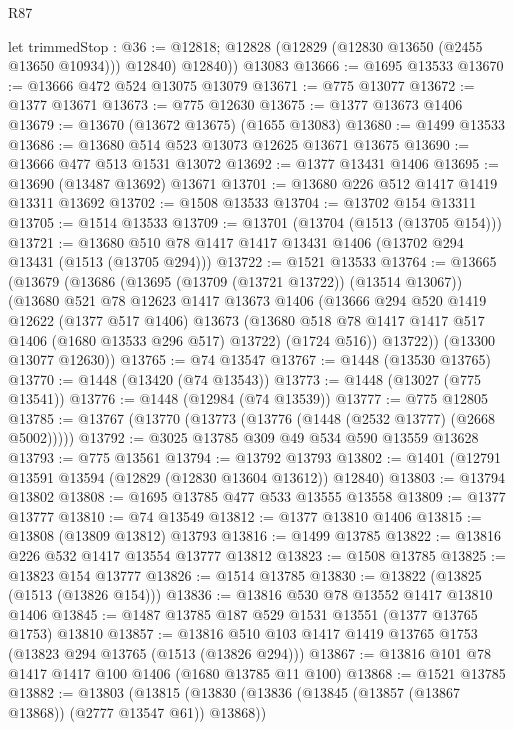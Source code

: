 \begin{lexlean}{R87}
\begin{coremodule}
{{        let trimmedStop : @36 := @12818;
        @12828 (@12829 (@12830 @13650 (@2455 @13650 @10934))) @12840)
        @12840))
    @13083
@13666 := @1695 @13533
@13670 := @13666 @472 @524 @13075 @13079
@13671 := @775 @13077
@13672 := @1377 @13671
@13673 := @775 @12630
@13675 := @1377 @13673 @1406
@13679 := @13670 (@13672 @13675) (@1655 @13083)
@13680 := @1499 @13533
@13686 := @13680 @514 @523 @13073 @12625 @13671 @13675
@13690 := @13666 @477 @513 @1531 @13072
@13692 := @1377 @13431 @1406
@13695 := @13690 (@13487 @13692) @13671
@13701 := @13680 @226 @512 @1417 @1419 @13311 @13692
@13702 := @1508 @13533
@13704 := @13702 @154 @13311
@13705 := @1514 @13533
@13709 := @13701 (@13704 (@1513 (@13705 @154)))
@13721 := @13680 @510 @78 @1417 @1417 @13431 @1406 (@13702 @294 @13431 (@1513 (@13705 @294)))
@13722 := @1521 @13533
@13764 := @13665
    (@13679
      (@13686
        (@13695 (@13709 (@13721 @13722)) (@13514 @13067))
        (@13680
          @521
          @78
          @12623
          @1417
          @13673
          @1406
          (@13666
            @294
            @520
            @1419
            @12622
            (@1377 @517 @1406)
            @13673
            (@13680 @518 @78 @1417 @1417 @517 @1406 (@1680 @13533 @296 @517) @13722)
            (@1724 @516))
          @13722))
      (@13300 @13077 @12630))
@13765 := @74 @13547
@13767 := @1448 (@13530 @13765)
@13770 := @1448 (@13420 (@74 @13543))
@13773 := @1448 (@13027 (@775 @13541))
@13776 := @1448 (@12984 (@74 @13539))
@13777 := @775 @12805
@13785 := @13767 (@13770 (@13773 (@13776 (@1448 (@2532 @13777) (@2668 @5002)))))
@13792 := @3025 @13785 @309 @49 @534 @590 @13559 @13628
@13793 := @775 @13561
@13794 := @13792 @13793
@13802 := @1401 (@12791 @13591 @13594 (@12829 (@12830 @13604 @13612)) @12840)
@13803 := @13794 @13802
@13808 := @1695 @13785 @477 @533 @13555 @13558
@13809 := @1377 @13777
@13810 := @74 @13549
@13812 := @1377 @13810 @1406
@13815 := @13808 (@13809 @13812) @13793
@13816 := @1499 @13785
@13822 := @13816 @226 @532 @1417 @13554 @13777 @13812
@13823 := @1508 @13785
@13825 := @13823 @154 @13777
@13826 := @1514 @13785
@13830 := @13822 (@13825 (@1513 (@13826 @154)))
@13836 := @13816 @530 @78 @13552 @1417 @13810 @1406
@13845 := @1487 @13785 @187 @529 @1531 @13551 (@1377 @13765 @1753) @13810
@13857 := @13816 @510 @103 @1417 @1419 @13765 @1753 (@13823 @294 @13765 (@1513 (@13826 @294)))
@13867 := @13816 @101 @78 @1417 @1417 @100 @1406 (@1680 @13785 @11 @100)
@13868 := @1521 @13785
@13882 := @13803
    (@13815
      (@13830 (@13836 (@13845 (@13857 (@13867 @13868)) (@2777 @13547 @61)) @13868))
}}
\end{coremodule}
\end{lexlean}
